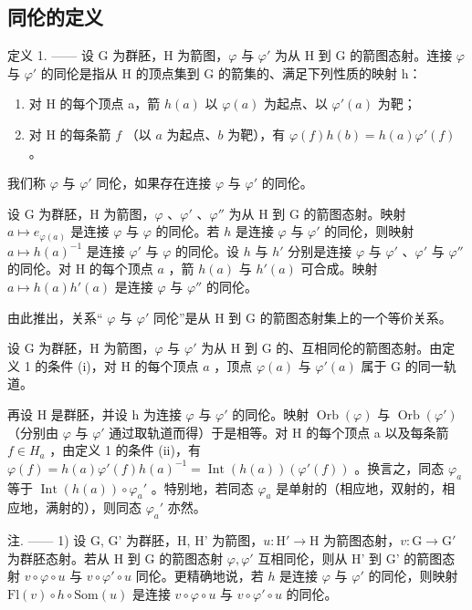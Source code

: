 \subsection{同伦的定义}

定义 1. —— 设 G 为群胚，H 为箭图，\(\varphi\) 与 \(\varphi'\) 为从 H 到 G 的箭图态射。连接 \(\varphi\) 与 \(\varphi'\) 的同伦是指从 H 的顶点集到 G 的箭集的、满足下列性质的映射 h：

\begin{enumerate}
\def\labelenumi{(\roman{enumi})}
\item
  对 H 的每个顶点 a，箭 \(h(a)\) 以 \(\varphi(a)\) 为起点、以 \(\varphi'(a)\) 为靶；
\item
  对 H 的每条箭 \(f\) （以 \(a\) 为起点、\(b\) 为靶），有 \(\varphi(f)h(b)=h(a)\varphi'(f)\) 。
\end{enumerate}

我们称 \(\varphi\) 与 \(\varphi'\) 同伦，如果存在连接 \(\varphi\) 与 \(\varphi'\) 的同伦。

设 G 为群胚，H 为箭图，\(\varphi\) 、\(\varphi'\) 、\(\varphi''\) 为从 H 到 G 的箭图态射。映射 \(a \mapsto e_{\varphi(a)}\) 是连接 \(\varphi\) 与 \(\varphi\) 的同伦。若 \(h\) 是连接 \(\varphi\) 与 \(\varphi'\) 的同伦，则映射 \(a \mapsto h(a)^{-1}\) 是连接 \(\varphi'\) 与 \(\varphi\) 的同伦。设 \(h\) 与 \(h'\) 分别是连接 \(\varphi\) 与 \(\varphi'\) 、\(\varphi'\) 与 \(\varphi''\) 的同伦。对 H 的每个顶点 \(a\) ，箭 \(h(a)\) 与 \(h'(a)\) 可合成。映射 \(a \mapsto h(a)h'(a)\) 是连接 \(\varphi\) 与 \(\varphi''\) 的同伦。

由此推出，关系“ \(\varphi\) 与 \(\varphi'\) 同伦”是从 H 到 G 的箭图态射集上的一个等价关系。

设 G 为群胚，H 为箭图，\(\varphi\) 与 \(\varphi'\) 为从 H 到 G 的、互相同伦的箭图态射。由定义 1 的条件 (i)，对 H 的每个顶点 \(a\) ，顶点 \(\varphi(a)\) 与 \(\varphi'(a)\) 属于 G 的同一轨道。

再设 H 是群胚，并设 h 为连接 \(\varphi\) 与 \(\varphi'\) 的同伦。映射 \(\operatorname{Orb}(\varphi)\) 与 \(\operatorname{Orb}(\varphi')\) （分别由 \(\varphi\) 与 \(\varphi'\) 通过取轨道而得）于是相等。对 H 的每个顶点 a 以及每条箭 \(f \in H_{a}\) ，由定义 1 的条件 (ii)，有 \(\varphi(f) = h(a)\varphi'(f)h(a)^{-1} = \operatorname{Int}(h(a))(\varphi'(f))\) 。换言之，同态 \(\varphi_{a}\) 等于 \(\operatorname{Int}(h(a)) \circ \varphi_{a}'\) 。特别地，若同态 \(\varphi_{a}\) 是单射的（相应地，双射的，相应地，满射的），则同态 \(\varphi_{a}'\) 亦然。

注. —— 1) 设 G, G' 为群胚，H, H' 为箭图，\(u\colon\mathrm{H}'\to\mathrm{H}\) 为箭图态射，\(v\colon\mathrm{G}\to\mathrm{G}'\) 为群胚态射。若从 H 到 G 的箭图态射 \(\varphi,\varphi'\) 互相同伦，则从 H' 到 G' 的箭图态射 \(v\circ\varphi\circ u\) 与 \(v\circ\varphi'\circ u\) 同伦。更精确地说，若 \(h\) 是连接 \(\varphi\) 与 \(\varphi'\) 的同伦，则映射 \(\mathrm{Fl}(v)\circ h\circ\mathrm{Som}(u)\) 是连接 \(v\circ\varphi\circ u\) 与 \(v\circ\varphi'\circ u\) 的同伦。

